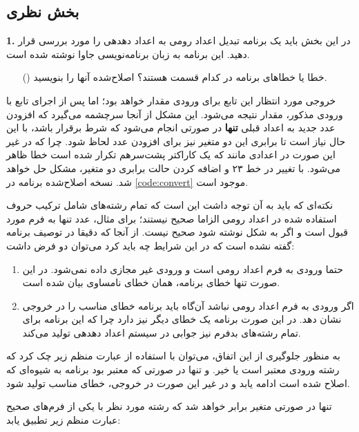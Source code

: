 \documentclass[twoside]{article}
\newenvironment{answer}{}{\medskip}
\newenvironment{question}[1]{\textbf{#1.} }{}
\newenvironment{qitem}[1]{%
	\begin{enumerate}\item[(\lr{#1})]}{\end{enumerate}}
\begin{document}
\subsection*{بخش نظری}
\begin{question}{1}
در این بخش باید یک برنامه تبدیل اعداد رومی به اعداد دهدهی را مورد بررسی قرار دهید. این برنامه به زبان برنامه‌نویسی جاوا نوشته شده است.
\end{question}
\begin{qitem}{a}
خطا یا خطاهای برنامه در کدام قسمت هستند؟ اصلاح‌شده آنها را بنویسید.
\end{qitem}
\begin{answer}
خروجی مورد انتظار این تابع برای ورودی  مقدار  خواهد بود؛ اما پس از اجرای تابع با ورودی مذکور، مقدار  نتیجه می‌شود. این مشکل از آنجا سرچشمه می‌گیرد که افزودن عدد جدید به اعداد قبلی \textbf{تنها} در صورتی انجام می‌شود که شرط  برقرار باشد، با این حال نیاز است تا برابری این دو متغیر نیز برای افزودن عدد لحاظ شود.
چرا که در غیر این صورت در اعدادی مانند  که یک کاراکتر پشت‌سرهم تکرار شده است خطا ظاهر می‌شود.
با تغییر در خط ۲۳ و اضافه کردن حالت برابری دو متغیر، مشکل حل خواهد شد. نسخه اصلاح‌شده برنامه در \autoref{code:convert} موجود است.

نکته‌ای که باید به آن توجه داشت این است که تمام رشته‌های شامل ترکیب حروف استفاده شده در اعداد رومی الزاما صحیح نیستند؛ برای مثال، عدد  تنها به فرم  مورد قبول است و اگر به شکل  نوشته شود صحیح نیست.
از آنجا که دقیقا در توصیف برنامه گفته نشده است که در این شرایط چه باید کرد می‌توان دو فرض داشت:
\begin{enumerate}
	\item
حتما ورودی به فرم اعداد رومی است و ورودی‌ غیر مجازی داده نمی‌شود. در این صورت تنها خطای برنامه، همان خطای نامساوی بیان شده است.
	\item
اگر ورودی به فرم اعداد رومی نباشد آن‌گاه باید برنامه خطای مناسب را در خروجی نشان دهد. در این صورت برنامه یک خطای دیگر نیز دارد چرا که این برنامه‌ برای تمام رشته‌های بدفرم نیز جوابی در سیستم اعداد دهدهی تولید می‌‌کند.
\end{enumerate}
به منظور جلوگیری از این اتفاق، می‌توان با استفاده از عبارت منظم زیر چک کرد که رشته ورودی معتبر است یا خیر. و تنها در صورتی که معتبر بود برنامه به شیوه‌ای که اصلاح شده است ادامه یابد و در غیر این صورت در خروجی، خطای مناسب تولید شود.

تنها در صورتی متغیر  برابر  خواهد شد که رشته مورد نظر با یکی از فرم‌های صحیح عبارت منظم زیر تطبیق یابد:
\end{answer}
\end{document}
